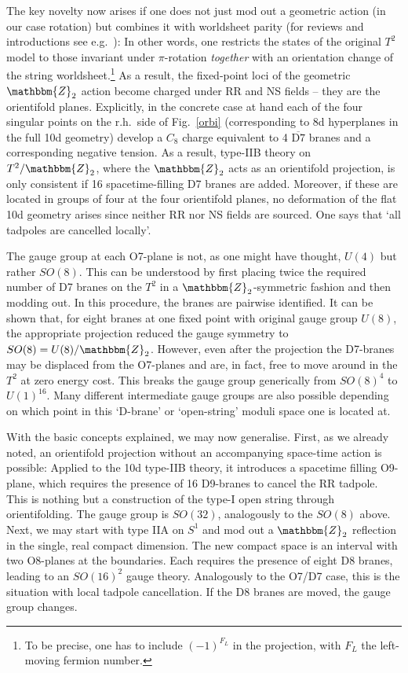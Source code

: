 \documentclass[12pt]{article}
\newcommand{\ol}{\overline}
\numberwithin{equation}{section}
\begin{document}
The key novelty now arises if one does not just mod out a geometric action (in our case rotation) but combines it with worldsheet parity (for reviews and introductions see e.g.~\cite{Polchinski:1996fm, Johnson:2000ch}): In other words, one restricts the states of the original $T^2$ model to those invariant under $\pi$-rotation {\it together} with an orientation change of the string worldsheet.\footnote{
To 
be precise, one has to include $(-1)^{F_L}$ in the projection, with $F_L$ the left-moving fermion number.
}
 As a result, the fixed-point loci of the geometric $\mathbbm{Z}_2$ action become charged under RR and NS fields -- they are the orientifold planes. Explicitly, in the concrete case at hand each of the four singular points on the r.h.~side of Fig.~\ref{orbi} (corresponding to 8d hyperplanes in the full 10d geometry) develop a $C_8$ charge equivalent to 4 $\ol{\mbox{D7}}$ branes and a corresponding negative tension. As a result, type-IIB theory on $T^2/\mathbbm{Z}_2$, where the $\mathbbm{Z}_2$ acts as an orientifold projection, is only consistent if 16 spacetime-filling D7 branes are added. Moreover, if these are located in groups of four at the four orientifold planes, no deformation of the flat 10d geometry arises since neither RR nor NS fields are sourced. One says that `all tadpoles are cancelled locally'. 

The gauge group at each O7-plane is not, as one might have thought, $U(4)$ but rather $SO(8)$. This can be understood by first placing twice the required number of D7 branes on the $T^2$ in a $\mathbbm{Z}_2$-symmetric fashion and then modding out. In this procedure, the branes are pairwise identified. It can be shown that, for eight branes at one fixed point with original gauge group $U(8)$, the appropriate projection reduced the gauge symmetry to $SO(8)=U(8)/\mathbbm{Z}_2$. However, even after the projection the D7-branes may be displaced from the O7-planes and are, in fact, free to move around in the $T^2$ at zero energy cost. This breaks the gauge group generically from $SO(8)^4$ to $U(1)^{16}$. Many different intermediate gauge groups are also possible depending on which point in this `D-brane' or `open-string' moduli space one is located at.

With the basic concepts explained, we may now generalise. First, as we already noted, an orientifold projection without an accompanying space-time action is possible: Applied to the 10d type-IIB theory, it introduces a spacetime filling O9-plane, which requires the presence of 16 D9-branes to cancel the RR tadpole. This is nothing but a construction of the type-I open string through orientifolding. The gauge group is $SO(32)$, analogously to the $SO(8)$ above. Next, we may start with type IIA on $S^1$ and mod out a $\mathbbm{Z}_2$ reflection in the single, real compact dimension. The new compact space is an interval with two O8-planes at the boundaries. Each requires the presence of eight D8 branes, leading to an $SO(16)^2$ gauge theory. Analogously to the O7/D7 case, this is the situation with local tadpole cancellation.
If the D8 branes are moved, the gauge group changes.
\end{document}
